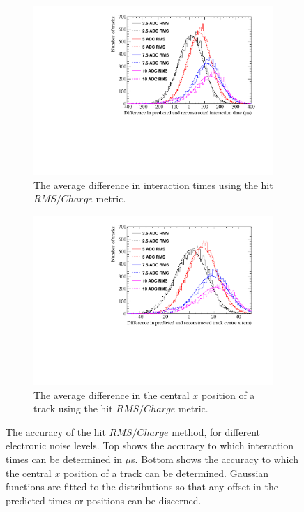 \begin{figure}[h!]
  \centering
  \begin{subfigure}{0.6\textwidth}
    \centering
    \includegraphics[width=\textwidth]{Canvas_AvDiff_T_RMS_Q_NoiseLevel}
    \caption{The average difference in interaction times using the hit $RMS/Charge$ metric.}
    \label{fig:DiffNoiseStudy_AvDiff_RMS_Int_T}
  \end{subfigure}
  \begin{subfigure}{0.6\textwidth}
    \centering
    \includegraphics[width=\textwidth]{Canvas_AvDiff_X_RMS_Q_NoiseLevel}
    \caption{The average difference in the central $x$ position of a track using the hit $RMS/Charge$ metric.}
    \label{fig:DiffNoiseStudy_AvDiff_RMS_Int_X}
  \end{subfigure}
  \caption[Comparing the accuracy of the hit $RMS$ method, as the electronic noise level changes]
          {The accuracy of the hit $RMS/Charge$ method, for different electronic noise levels. Top shows the accuracy to which interaction times can be determined in $\mu$s. Bottom shows the accuracy to which the central $x$ position of a track can be determined. Gaussian functions are fitted to the distributions so that any offset in the predicted times or positions can be discerned.}
  \label{fig:DiffNoiseStudy_AvDiff_RMS_Int}
\end{figure}


